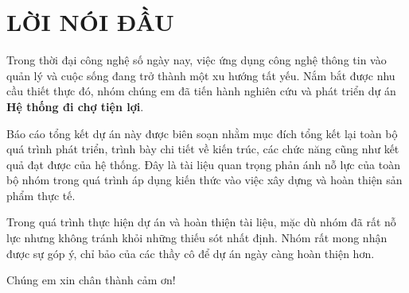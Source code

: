\chapter*{LỜI NÓI ĐẦU}

Trong thời đại công nghệ số ngày nay, việc ứng dụng công nghệ thông tin vào quản lý và cuộc sống đang trở thành một xu hướng tất yếu. Nắm bắt được nhu cầu thiết thực đó, nhóm chúng em đã tiến hành nghiên cứu và phát triển dự án \textbf{Hệ thống đi chợ tiện lợi}.

Báo cáo tổng kết dự án này được biên soạn nhằm mục đích tổng kết lại toàn bộ quá trình phát triển, trình bày chi tiết về kiến trúc, các chức năng cũng như kết quả đạt được của hệ thống. Đây là tài liệu quan trọng phản ánh nỗ lực của toàn bộ nhóm trong quá trình áp dụng kiến thức vào việc xây dựng và hoàn thiện sản phẩm thực tế.

Trong quá trình thực hiện dự án và hoàn thiện tài liệu, mặc dù nhóm đã rất nỗ lực nhưng không tránh khỏi những thiếu sót nhất định. Nhóm rất mong nhận được sự góp ý, chỉ bảo của các thầy cô để dự án ngày càng hoàn thiện hơn.

Chúng em xin chân thành cảm ơn!
